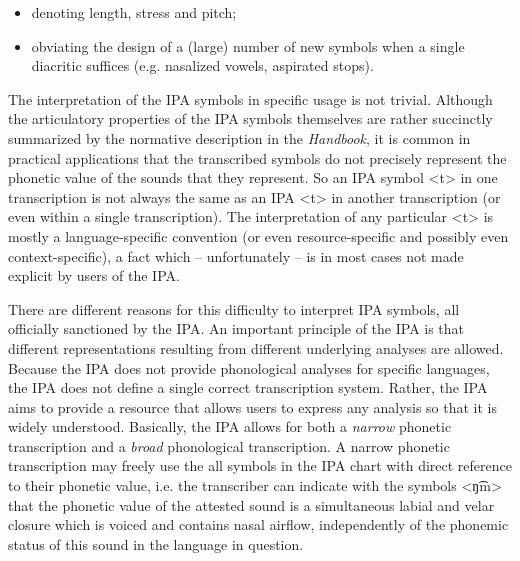 \begin{itemize}

 	\item denoting length, stress and pitch;
	\item obviating the design of a (large) number of new symbols when a 
		  single diacritic suffices (e.g. nasalized vowels, aspirated stops). 
               
\end{itemize}	

The interpretation of the IPA symbols in specific usage is not trivial. Although
the articulatory properties of the IPA symbols themselves are rather succinctly
summarized by the normative description in the \textit{Handbook}, it is common
in practical applications that the transcribed symbols do not precisely
represent the phonetic value of the sounds that they represent. So an IPA symbol
<t> in one transcription is not always the same as an IPA <t> in another
transcription (or even within a single transcription). The interpretation of any
particular <t> is mostly a language-specific convention (or even
resource-specific and possibly even context-specific), a fact which --
unfortunately -- is in most cases not made explicit by users of the IPA.

There are different reasons for this difficulty to interpret IPA symbols, all
officially sanctioned by the IPA. An important principle of the IPA is that
different representations resulting from different underlying analyses are
allowed. Because the IPA does not provide phonological analyses for specific
languages, the IPA does not define a single correct transcription system.
Rather, the IPA aims to provide a resource that allows users to express any
analysis so that it is widely understood. Basically, the IPA allows for both a 
\textit{narrow} phonetic transcription and a \textit{broad} phonological transcription. 
A narrow phonetic transcription may freely use the all symbols in the IPA 
chart with direct reference to their phonetic value, i.e. the transcriber can 
indicate with the symbols <ŋ͡m> that the phonetic value of the attested sound 
is a simultaneous labial and velar closure which is voiced and contains nasal 
airflow, independently of the phonemic status of this sound in the language in 
question. 


